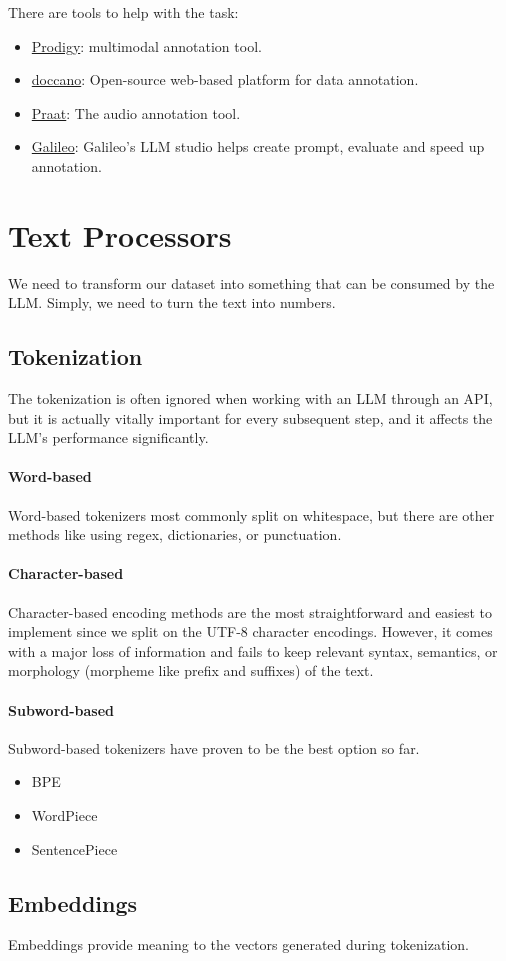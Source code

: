 There are tools to help with the task:
\begin{itemize}
	\item \href{https://prodi.gy/}{Prodigy}: multimodal annotation tool.
	\item \href{https://github.com/doccano/doccano}{doccano}: Open-source web-based platform for data annotation. 
	\item \href{https://www.fon.hum.uva.nl/praat/}{Praat}: The audio annotation tool.
	\item \href{https://galileo.ai/}{Galileo}: Galileo's LLM studio helps create prompt, evaluate and speed up annotation. 
\end{itemize}

\section{Text Processors}

We need to transform our dataset into something that can be consumed by the LLM. Simply, we need to turn the text into numbers.  

\subsection{Tokenization}
The tokenization is often ignored when working with an LLM through an API, but it is actually vitally important for every subsequent step, and it affects the LLM's performance significantly. 

\paragraph{Word-based}
Word-based tokenizers most commonly split on whitespace, but there are other methods like using regex, dictionaries, or punctuation. 

\paragraph{Character-based}
Character-based encoding methods are the most straightforward and easiest to implement since we split on the UTF-8 character encodings. However, it comes with a major loss of information and fails to keep relevant syntax, semantics, or morphology (morpheme like prefix and suffixes) of the text. 

\paragraph{Subword-based}
Subword-based tokenizers have proven to be the best option so far. 
\begin{itemize}
	\item BPE
	\item WordPiece
	\item SentencePiece
\end{itemize}

\subsection{Embeddings}
Embeddings provide meaning to the vectors generated during tokenization. 






